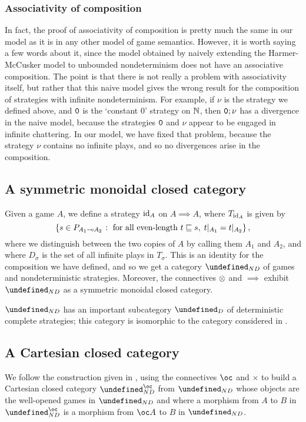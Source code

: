 \documentclass[sigplan,9pt,review]{acmart}\settopmatter{printfolios=true,printccs=false,printacmref=false}
\let\G\undefined
\begin{document}
\subsubsection{Associativity of composition}

In fact, the proof of associativity of composition is pretty much the same in our model as it is in any other model of game semantics.  
However, it is worth saying a few words about it, since the model obtained by naively extending the Harmer-McCusker model to unbounded nondeterminism does not have an associative composition.  
The point is that there is not really a problem with associativity itself, but rather that this naive model gives the wrong result for the composition of strategies with infinite nondeterminism.
For example, if $\nu$ is the strategy we defined above, and ${\mathtt{0}}$ is the `constant $0$' strategy on $\mathbb{N}$, then ${\mathtt{0}};\nu$ has a divergence in the naive model, because the strategies ${\mathtt{0}}$ and $\nu$ appear to be engaged in infinite chattering.  
In our model, we have fixed that problem, because the strategy $\nu$ contains no infinite plays, and so no divergences arise in the composition.

\subsection{A symmetric monoidal closed category}

Given a game $A$, we define a strategy $\operatorname{id}_A$ on $A\implies A$, where $T_{\operatorname{id}_A}$ is given by
\[
  \{s\in P_{A_1\multimap A_2}\;\colon\;\textrm{for all even-length }t\sqsubseteq s,\;t\vert_{A_1}=t\vert_{A_2}\}\,,
  \]
where we distinguish between the two copies of $A$ by calling them $A_1$ and $A_2$, and where $D_\sigma$ is the set of all infinite plays in $T_\sigma$.
This is an identity for the composition we have defined, and so we get a category $\G_{ND}$ of games and nondeterministic strategies.
Moreover, the connectives $\otimes$ and $\implies$ exhibit $\G_{ND}$ as a symmetric monoidal closed category.  

$\G_{ND}$ has an important subcategory $\G_D$ of deterministic complete strategies; this category is isomorphic to the category considered in \cite{SamsonGuyIAPassive}.

\subsection{A Cartesian closed category}

We follow the construction given in \cite{SamsonGuyIAPassive}, using the connectives $\oc$ and $\times$ to build a Cartesian closed category $\G_{ND}^\oc$ from $\G_{ND}$ whose objects are the well-opened games in $\G_{ND}$ and where a morphism from $A$ to $B$ in $\G_{ND}^\oc$ is a morphism from $\oc A$ to $B$ in $\G_{ND}$.  
\end{document}
